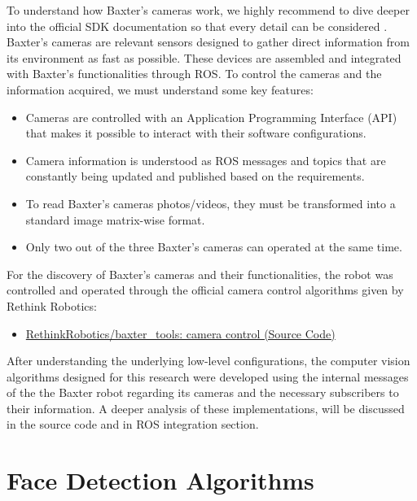 \documentclass[11pt]{report} %
\begin{document}
To understand how Baxter's cameras work, we highly recommend to dive deeper into the official SDK documentation so that every detail can be considered \citep{cite_baxter_cameras_wiki}.\\

Baxter's cameras are relevant sensors designed to gather direct information from its environment as fast as possible. These devices are assembled and integrated with Baxter's functionalities through ROS. To control the cameras and the information acquired, we must understand some key features:

\begin{itemize}
    \item Cameras are controlled with an Application Programming Interface (API) that makes it possible to interact with their software configurations.
    \item Camera information is understood as ROS messages and topics that are constantly being updated and published based on the requirements.
    \item To read Baxter's cameras photos/videos, they must be transformed into a standard image matrix-wise format.
    \item Only two out of the three Baxter's cameras can operated at the same time.
\end{itemize}

For the discovery of Baxter's cameras and their functionalities, 
the robot was controlled and operated through the official camera control algorithms given by Rethink Robotics:

\begin{itemize}
    \color{blue}
    \item \href{https://github.com/RethinkRobotics/baxter_tools/blob/master/scripts/camera_control.py}{RethinkRobotics/baxter\_tools: camera control (Source Code)}
\end{itemize}

After understanding the underlying low-level configurations, the computer vision algorithms designed for this research were developed using the internal messages of the the Baxter robot regarding its cameras and the necessary subscribers to their information. A deeper analysis of these implementations, will be discussed in the source code and in ROS integration section.\\


\section{Face Detection Algorithms}
\end{document}
